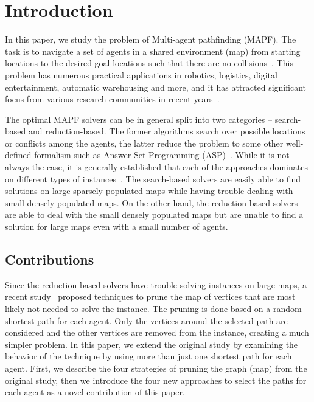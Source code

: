 \section{Introduction}

In this paper, we study the problem of Multi-agent pathfinding (MAPF). The task is to navigate a set of agents in a shared environment (map) from starting locations to the desired goal locations such that there are no collisions~\cite{DBLP:conf/aiide/Silver05}. This problem has numerous practical applications in robotics, logistics, digital entertainment, automatic warehousing and more, and it has attracted significant focus from various research communities in recent years~\cite{sven_lifelong,DBLP:conf/ijcai/Surynek19,ngobsoscye17a,geobscra18a}.

The optimal MAPF solvers can be in general split into two categories -- search-based and reduction-based. The former algorithms search over possible locations or conflicts among the agents, the latter reduce the problem to some other well-defined formalism such as Answer Set Programming (ASP)~\cite{geobotscsangso18a}. While it is not always the case, it is generally established that each of the approaches dominates on different types of instances~\cite{DBLP:journals/access/GomezHB21,DBLP:conf/icaart/SvancaraB19}. The search-based solvers are easily able to find solutions on large sparsely populated maps while having trouble dealing with small densely populated maps. On the other hand, the reduction-based solvers are able to deal with the small densely populated maps but are unable to find a solution for large maps even with a small number of agents.

\subsection{Contributions}

Since the reduction-based solvers have trouble solving instances on large maps, a recent study~\cite{AAMAS_corridors} proposed techniques to prune the map of vertices that are most likely not needed to solve the instance. The pruning is done based on a random shortest path for each agent. Only the vertices around the selected path are considered and the other vertices are removed from the instance, creating a much simpler problem. In this paper, we extend the original study by examining the behavior of the technique by using more than just one shortest path for each agent. First, we describe the four strategies of pruning the graph (map) from the original study, then we introduce the four new approaches to select the paths for each agent as a novel contribution of this paper.

